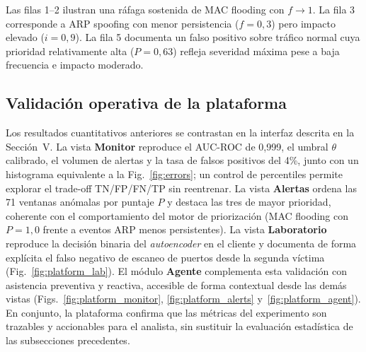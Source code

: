 \documentclass[conference]{IEEEtran}
\newcommand{\trafonormal}{tráfico normal}
\newcommand{\arpspoof}{ARP spoofing}
\newcommand{\macflood}{MAC flooding}
\newcommand{\portscan}{escaneo de puertos}
\newcommand{\victimados}{segunda víctima}
\begin{document}
\begin{table}[htbp]
\caption{Ejemplo de priorización de alertas (\victimados, $\theta=0{,}114$, $W=10$)}
\label{tab:priorizacion_ejemplo}
\centering
\renewcommand{\arraystretch}{1.12}
\footnotesize
{}
\end{table}

Las filas 1--2 ilustran una ráfaga sostenida de \macflood{} con
$f \rightarrow 1$. La fila 3 corresponde a \arpspoof{} con menor
persistencia ($f=0{,}3$) pero impacto elevado ($i=0{,}9$). La fila 5
documenta un falso positivo sobre \trafonormal{} cuya prioridad
relativamente alta ($P=0{,}63$) refleja severidad máxima pese a baja
frecuencia e impacto moderado.

\subsection{Validación operativa de la plataforma}
Los resultados cuantitativos anteriores se contrastan en la interfaz
descrita en la Sección~V. La vista \textbf{Monitor} reproduce el
AUC-ROC de 0{,}999, el umbral $\theta$ calibrado, el volumen de alertas
y la tasa de falsos positivos del 4\%, junto con un histograma
equivalente a la Fig.~\ref{fig:errors}; un control de percentiles permite
explorar el trade-off TN/FP/FN/TP sin reentrenar. La vista
\textbf{Alertas} ordena las 71 ventanas anómalas por puntaje $P$ y
destaca las tres de mayor prioridad, coherente con el comportamiento del
motor de priorización (\macflood{} con $P=1{,}0$ frente a eventos ARP
menos persistentes). La vista \textbf{Laboratorio} reproduce la decisión
binaria del \textit{autoencoder} en el cliente y documenta de forma
explícita el falso negativo de \portscan{} desde la \victimados{}
(Fig.~\ref{fig:platform_lab}). El módulo \textbf{Agente} complementa
esta validación con asistencia preventiva y reactiva, accesible de forma
contextual desde las demás vistas (Figs.~\ref{fig:platform_monitor},
\ref{fig:platform_alerts} y~\ref{fig:platform_agent}). En conjunto, la
plataforma confirma que las métricas del experimento son trazables y
accionables para el analista, sin sustituir la evaluación estadística
de las subsecciones precedentes.
\end{document}

